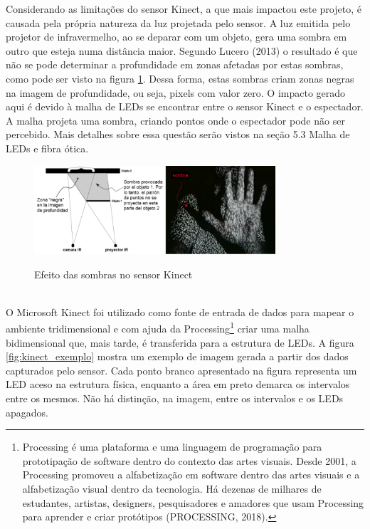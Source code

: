 Considerando as limitações do sensor Kinect, a que mais impactou este projeto, é causada pela própria natureza da luz projetada pelo sensor. A luz emitida pelo projetor de infravermelho, ao se deparar com um objeto, gera uma sombra em outro que esteja numa distância maior. Segundo Lucero (2013) o resultado é que não se pode determinar a profundidade em zonas afetadas por estas sombras, como pode ser visto na figura \ref{fig:kinect_sombras}. Dessa forma, estas sombras criam zonas negras na imagem de profundidade, ou seja, pixels com valor zero. O impacto gerado aqui é devido à malha de LEDs se encontrar entre o sensor Kinect e o espectador. A malha projeta uma sombra, criando pontos onde o espectador pode não ser percebido.  Mais detalhes sobre essa questão serão vistos na seção 5.3 Malha de LEDs e fibra ótica.

\begin{figure}[H]
    \centering
    \caption{Efeito das sombras no sensor Kinect}
	\vspace*{0,2cm}
    \includegraphics[width=0.8\textwidth]{./04-figuras/kinect_sombras}
    \label{fig:kinect_sombras}
\end{figure}
\vspace*{-0,9cm}
{\raggedright {}}\\


O Microsoft Kinect foi utilizado como fonte de entrada de dados para mapear o ambiente tridimensional e com ajuda da Processing\footnote{Processing é uma plataforma e uma linguagem de programação para prototipação de software dentro do contexto das artes visuais. Desde 2001, a Processing promoveu a alfabetização em software dentro das artes visuais e a alfabetização visual dentro da tecnologia. Há dezenas de milhares de estudantes, artistas, designers, pesquisadores e amadores que usam Processing para aprender e criar protótipos (PROCESSING, 2018).} criar uma malha bidimensional que, mais tarde, é transferida para a estrutura de LEDs. A figura \ref{fig:kinect_exemplo} mostra um exemplo de imagem gerada a partir dos dados capturados pelo sensor. Cada ponto branco apresentado na figura representa um LED aceso na estrutura física, enquanto a área em preto demarca os intervalos entre os mesmos. Não há distinção, na imagem, entre os intervalos e os LEDs apagados. 

